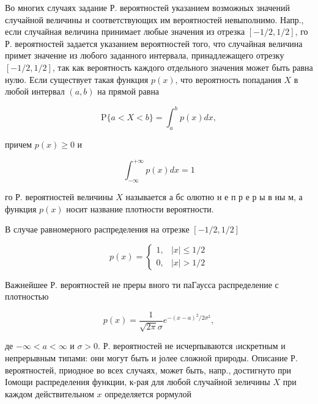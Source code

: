\documentclass[10pt]{article}
\begin{document}
Во многих случаях задание Р. вероятностей указанием возможных значений случайной величины и соответствующих им вероятностей невыполнимо. Напр., если случайная величина принимает любые значения из отрезка $[-1 / 2,1 / 2]$, го Р. вероятностей задается указанием вероятностей того, что случайная величина примет значение из любого заданного интервала, принадлежащего отрезку $[-1 / 2,1 / 2]$, так как вероятность каждого отдельного значения может быть равна нулю. Если существует такая функция $p(x)$, что вероятность попадания $X$ в любой интервал $(a, b)$ на прямой равна



\[

\mathrm{P}\{a<X<b\}=\int_{a}^{b} p(x) d x,

\]



причем $p(x) \geqslant 0$ и



\[

\int_{-\infty}^{+\infty} p(x) d x=1

\]



го Р. вероятностей величины $X$ называется а бс олютно н е п р е р ы в ны м, а функция $p(x)$ носит название плотности вероятности.



В случае равномерного распределения на отрезке $[-1 / 2,1 / 2]$



\[

p(x)= \begin{cases}1, & |x| \leqslant 1 / 2 \\ 0, & |x|>1 / 2\end{cases}

\]



Важнейшее Р. вероятностей не преры вного ти паГаусса распределение с плотностью



\[

p(x)=\frac{1}{\sqrt{2 \pi} \sigma} e^{-(x-a)^{2} / 2 \sigma^{2}},

\]



де $-\infty<a<\infty$ и $\sigma>0$. Р. вероятностей не исчерпываются ıискретным и непрерывным типами: они могут быть и јолее сложной природы. Описание Р. вероятностей, приодное во всех случаях, может быть, напр., достигнуто при Іомощи распределения функции, к-рая для любой случайной зеличины $X$ при каждом действительном $x$ определяется рормулой
\end{document}

